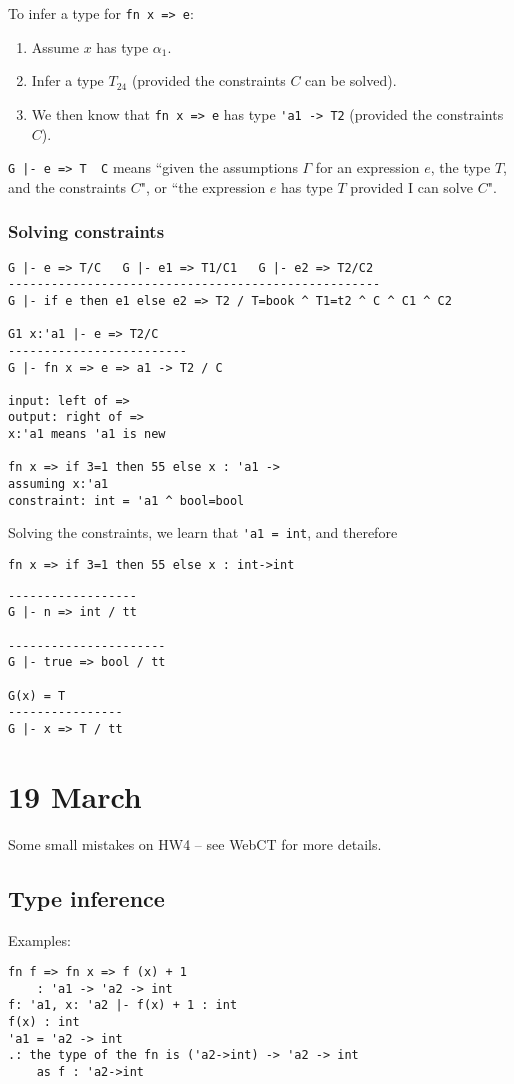 \documentclass[11pt]{article}
\begin{document}
To infer a type for \verb~fn x => e~:
\begin{enumerate}
    \item Assume $x$ has type $\alpha_1$.
    \item Infer a type $T_24$ (provided the constraints $C$ can be solved).
    \item We then know that \verb~fn x => e~ has type \verb~'a1 -> T2~ (provided the constraints $C$).
\end{enumerate}

\verb~G |- e => T  C~ means ``given the assumptions $\Gamma$ for an expression $e$, the type $T$, and the constraints $C$", or ``the expression $e$ has type $T$ provided I can solve $C$".

\subsubsection{Solving constraints}
\begin{verbatim}
G |- e => T/C   G |- e1 => T1/C1   G |- e2 => T2/C2
----------------------------------------------------
G |- if e then e1 else e2 => T2 / T=book ^ T1=t2 ^ C ^ C1 ^ C2

G1 x:'a1 |- e => T2/C
-------------------------
G |- fn x => e => a1 -> T2 / C

input: left of =>
output: right of =>
x:'a1 means 'a1 is new

fn x => if 3=1 then 55 else x : 'a1 ->
assuming x:'a1
constraint: int = 'a1 ^ bool=bool
\end{verbatim}

Solving the constraints, we learn that \verb~'a1 = int~, and therefore
\begin{verbatim}
fn x => if 3=1 then 55 else x : int->int
\end{verbatim}

\begin{verbatim}
------------------
G |- n => int / tt

----------------------
G |- true => bool / tt

G(x) = T
----------------
G |- x => T / tt
\end{verbatim}

\section{19 March}
Some small mistakes on HW4 -- see WebCT for more details.

\subsection{Type inference}
Examples:
\begin{verbatim}
fn f => fn x => f (x) + 1
    : 'a1 -> 'a2 -> int
f: 'a1, x: 'a2 |- f(x) + 1 : int
f(x) : int
'a1 = 'a2 -> int
.: the type of the fn is ('a2->int) -> 'a2 -> int
    as f : 'a2->int
\end{verbatim}
\end{document}
